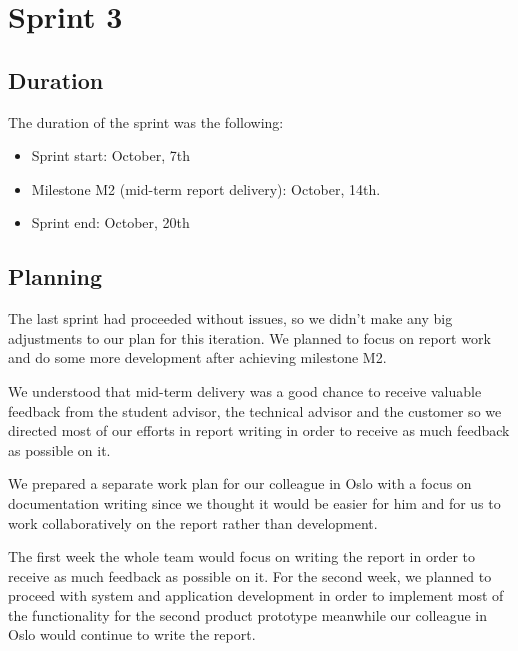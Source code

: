 
\chapter{Sprint 3}
\label{Sprint3}

\section{Duration}
The duration of the sprint was the following:
\begin{itemize}
\item Sprint start:  October, 7th
\item Milestone M2 (mid-term report delivery): October, 14th.
\item Sprint end: October, 20th
\end{itemize}

\section{Planning}

The last sprint had proceeded without issues, so we didn't make any big adjustments to our plan for this iteration. 
We planned to focus on report work and do some more development after achieving milestone M2.

We understood that mid-term delivery was a good chance to receive valuable feedback from the student advisor, the technical advisor and the customer so we directed most of our efforts in report writing in order to receive as much feedback as possible on it.

We prepared a separate work plan for our colleague in Oslo with a focus on documentation
writing since we thought it would be easier for him and for us to work collaboratively
on the report rather than development.

\iffalse
The first week the whole team would focus on writing the report
in order to receive as much feedback as possible on it. 
For the second week, %
we planned to proceed with system and application development %
in order to implement most of the functionality for the second product prototype meanwhile
our colleague in Oslo would continue to write the report.

